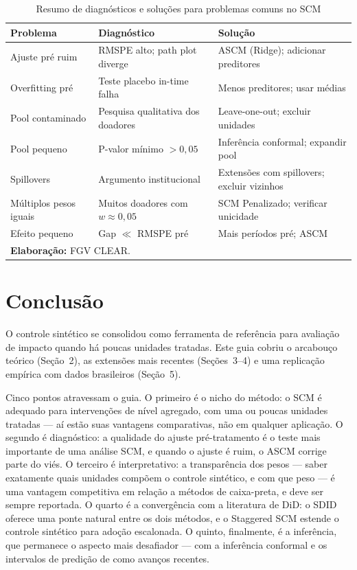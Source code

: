 \documentclass[12pt, a4paper, openany]{book}
\begin{document}
\begin{table}[H]
\centering
\caption{Resumo de diagnósticos e soluções para problemas comuns no SCM}
\label{tab:diagnosticos}
\footnotesize
\begin{tabular}{p{3.5cm}p{4cm}p{5cm}}
\toprule
\textbf{Problema} & \textbf{Diagnóstico} & \textbf{Solução} \\
\midrule
Ajuste pré ruim & RMSPE alto; path plot diverge & ASCM (Ridge); adicionar preditores \\
Overfitting pré & Teste placebo in-time falha & Menos preditores; usar médias \\
Pool contaminado & Pesquisa qualitativa dos doadores & Leave-one-out; excluir unidades \\
Pool pequeno & P-valor mínimo $> 0{,}05$ & Inferência conformal; expandir pool \\
Spillovers & Argumento institucional & Extensões com spillovers; excluir vizinhos \\
Múltiplos pesos iguais & Muitos doadores com $w \approx 0{,}05$ & SCM Penalizado; verificar unicidade \\
Efeito pequeno & Gap $ \ll $ RMSPE pré & Mais períodos pré; ASCM \\
\bottomrule
\multicolumn{3}{l}{\footnotesize \textbf{Elaboração:} FGV CLEAR.}
\end{tabular}
\end{table}


\newpage
\chapter{Conclusão}

O controle sintético se consolidou como ferramenta de referência para avaliação de impacto quando há poucas unidades tratadas. Este guia cobriu o arcabouço teórico (Seção~2), as extensões mais recentes (Seções~3--4) e uma replicação empírica com dados brasileiros (Seção~5).

Cinco pontos atravessam o guia. O primeiro é o nicho do método: o SCM é adequado para intervenções de nível agregado, com uma ou poucas unidades tratadas --- aí estão suas vantagens comparativas, não em qualquer aplicação. O segundo é diagnóstico: a qualidade do ajuste pré-tratamento é o teste mais importante de uma análise SCM, e quando o ajuste é ruim, o ASCM corrige parte do viés. O terceiro é interpretativo: a transparência dos pesos --- saber exatamente quais unidades compõem o controle sintético, e com que peso --- é uma vantagem competitiva em relação a métodos de caixa-preta, e deve ser sempre reportada. O quarto é a convergência com a literatura de DiD: o SDID oferece uma ponte natural entre os dois métodos, e o Staggered SCM estende o controle sintético para adoção escalonada. O quinto, finalmente, é a inferência, que permanece o aspecto mais desafiador --- com a inferência conformal e os intervalos de predição de \citet{CattaneoFengPalombaTitiunik2025} como avanços recentes.
\end{document}
